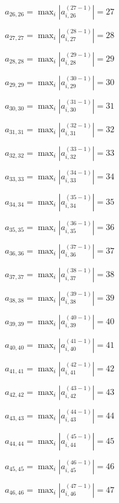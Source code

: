 \documentclass[a4paper,12pt]{article}
\begin{document}
$a _{ 26, 26 } =  \max _i |a _{ i, 26 } ^{ (27 - 1) } | = 27$

$a _{ 27, 27 } =  \max _i |a _{ i, 27 } ^{ (28 - 1) } | = 28$

$a _{ 28, 28 } =  \max _i |a _{ i, 28 } ^{ (29 - 1) } | = 29$

$a _{ 29, 29 } =  \max _i |a _{ i, 29 } ^{ (30 - 1) } | = 30$

$a _{ 30, 30 } =  \max _i |a _{ i, 30 } ^{ (31 - 1) } | = 31$

$a _{ 31, 31 } =  \max _i |a _{ i, 31 } ^{ (32 - 1) } | = 32$

$a _{ 32, 32 } =  \max _i |a _{ i, 32 } ^{ (33 - 1) } | = 33$

$a _{ 33, 33 } =  \max _i |a _{ i, 33 } ^{ (34 - 1) } | = 34$

$a _{ 34, 34 } =  \max _i |a _{ i, 34 } ^{ (35 - 1) } | = 35$

$a _{ 35, 35 } =  \max _i |a _{ i, 35 } ^{ (36 - 1) } | = 36$

$a _{ 36, 36 } =  \max _i |a _{ i, 36 } ^{ (37 - 1) } | = 37$

$a _{ 37, 37 } =  \max _i |a _{ i, 37 } ^{ (38 - 1) } | = 38$

$a _{ 38, 38 } =  \max _i |a _{ i, 38 } ^{ (39 - 1) } | = 39$

$a _{ 39, 39 } =  \max _i |a _{ i, 39 } ^{ (40 - 1) } | = 40$

$a _{ 40, 40 } =  \max _i |a _{ i, 40 } ^{ (41 - 1) } | = 41$

$a _{ 41, 41 } =  \max _i |a _{ i, 41 } ^{ (42 - 1) } | = 42$

$a _{ 42, 42 } =  \max _i |a _{ i, 42 } ^{ (43 - 1) } | = 43$

$a _{ 43, 43 } =  \max _i |a _{ i, 43 } ^{ (44 - 1) } | = 44$

$a _{ 44, 44 } =  \max _i |a _{ i, 44 } ^{ (45 - 1) } | = 45$

$a _{ 45, 45 } =  \max _i |a _{ i, 45 } ^{ (46 - 1) } | = 46$

$a _{ 46, 46 } =  \max _i |a _{ i, 46 } ^{ (47 - 1) } | = 47$
\end{document}
